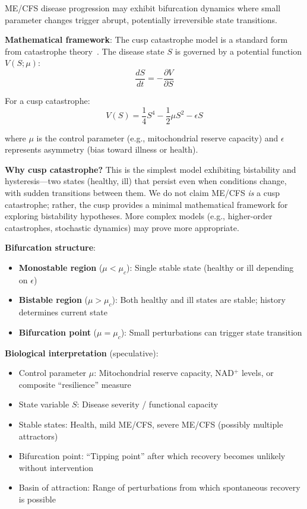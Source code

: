\begin{hypothesis}
ME/CFS disease progression may exhibit bifurcation dynamics where small parameter changes trigger abrupt, potentially irreversible state transitions.

\textbf{Mathematical framework}: The cusp catastrophe model is a standard form from catastrophe theory~\cite{Zeeman1977catastrophe}. The disease state $S$ is governed by a potential function $V(S; \mu)$:
\[
\frac{dS}{dt} = -\frac{\partial V}{\partial S}
\]

For a cusp catastrophe:
\[
V(S) = \frac{1}{4}S^4 - \frac{1}{2}\mu S^2 - \epsilon S
\]

where $\mu$ is the control parameter (e.g., mitochondrial reserve capacity) and $\epsilon$ represents asymmetry (bias toward illness or health).

\textbf{Why cusp catastrophe?} This is the simplest model exhibiting bistability and hysteresis---two states (healthy, ill) that persist even when conditions change, with sudden transitions between them. We do not claim ME/CFS \textit{is} a cusp catastrophe; rather, the cusp provides a minimal mathematical framework for exploring bistability hypotheses. More complex models (e.g., higher-order catastrophes, stochastic dynamics) may prove more appropriate.

\textbf{Bifurcation structure}:
\begin{itemize}
    \item \textbf{Monostable region} ($\mu < \mu_c$): Single stable state (healthy or ill depending on $\epsilon$)
    \item \textbf{Bistable region} ($\mu > \mu_c$): Both healthy and ill states are stable; history determines current state
    \item \textbf{Bifurcation point} ($\mu = \mu_c$): Small perturbations can trigger state transition
\end{itemize}

\textbf{Biological interpretation} (speculative):
\begin{itemize}
    \item Control parameter $\mu$: Mitochondrial reserve capacity, NAD$^+$ levels, or composite ``resilience'' measure
    \item State variable $S$: Disease severity / functional capacity
    \item Stable states: Health, mild ME/CFS, severe ME/CFS (possibly multiple attractors)
    \item Bifurcation point: ``Tipping point'' after which recovery becomes unlikely without intervention
    \item Basin of attraction: Range of perturbations from which spontaneous recovery is possible
\end{itemize}


\end{hypothesis}
